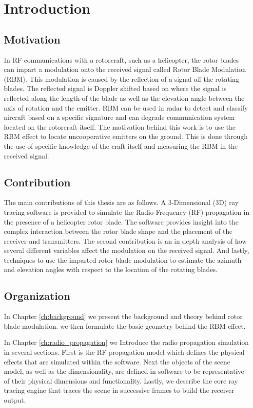 \chapter{Introduction}

\section{Motivation}
In RF communications with a rotorcraft, such as a helicopter, the rotor blades can impart a modulation onto the received signal called Rotor Blade Modulation (RBM). This modulation is caused by the reflection of a signal off the rotating blades. The reflected signal is Doppler shifted based on where the signal is reflected along the length of the blade as well as the elevation angle between the axis of rotation and the emitter. RBM can be used in radar to detect and classify aircraft based on a specific signature and can degrade communication system located on the rotorcraft itself. The motivation behind this work is to use the RBM effect to locate uncooperative emitters on the ground. This is done through the use of specific knowledge of the craft itself and measuring the RBM in the received signal.

\section{Contribution}
The main contributions of this thesis are as follows. A 3-Dimensional (3D) ray tracing software is provided to simulate the Radio Frequency (RF) propagation in the presence of a helicopter rotor blade. The software provides insight into the complex interaction between the rotor blade shape and the placement of the receiver and transmitters. The second contribution is an in depth analysis of how several different variables affect the modulation on the received signal. And lastly, techniques to use the imparted rotor blade modulation to estimate the azimuth and elevation angles with respect to the location of the rotating blades.

\section{Organization}
In Chapter \ref{ch:background} we present the background and theory behind rotor blade modulation. we then formulate the basic geometry behind the RBM effect.

In Chapter \ref{ch:radio_propagation} we Introduce the radio propagation simulation in several sections. First is the RF propagation model which defines the physical effects that are simulated within the software. Next the objects of the scene model, as well as the dimensionality, are defined in software to be representative of their physical  dimensions and functionality. Lastly, we describe the core ray tracing engine that traces the scene in successive frames to build the receiver output.

